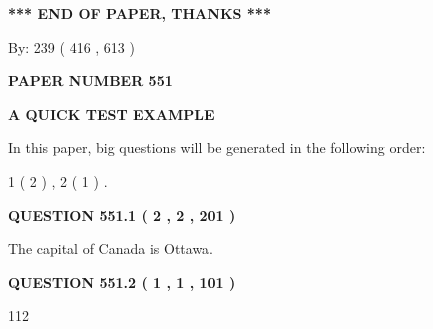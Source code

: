 \documentclass[12pt]{article}
\begin{document}
   
   
   
   
\vspace{1.0in} 
{\textbf{\large{ *** END OF PAPER, THANKS *** }}} 
   
   
\hspace{1.0in} By: 
 239 ( 416 ,  613 )
   
   
   
   
\newpage 
\setcounter{page}{ 
   551001 } 
   
   
   
   
 {\textbf{ \Large{ PAPER NUMBER  551  }}}
   
   
\vspace{0.2in}
   
   
   
   
   
   
 \vspace{0.2in}
{\LARGE {\textbf{ A QUICK TEST EXAMPLE}}}
   
   
   
\vspace{0.2in}
   
In this paper, big questions will be generated in the following order: 
   
   
   1 ( 2 )
 ,
   2 ( 1 )
 .
  
\vspace{0.2in}
  
{\textbf{\Large{QUESTION
551.1 
 ( 2 , 2 , 201 )
}}}
  
  
 
 
\noindent{}
 
 
The capital of Canada is Ottawa.
 
 
 
 
  
\vspace{0.2in}
  
{\textbf{\Large{QUESTION
551.2 
 ( 1 , 1 , 101 )
}}}
  
  
 
 
\noindent{}

112
 
 
 
 
\noindent{}
\end{document}
